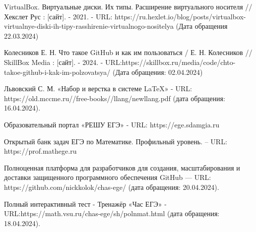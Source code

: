 \begin{thebibliography}{99}

VirtualBox. Виртуальные диски. Их типы. Расширение виртуального носителя // Хекслет Рус : [сайт]. - 2021. - URL: https://ru.hexlet.io/blog/posts/virtualbox-virtualnye-diski-ih-tipy-rasshirenie-virtualnogo-nositelya (Дата обращения 22.03.2024)

\end{thebibliography}

\begin{thebibliography}{99}

Колесников Е. Н. Что такое GitHub и как им пользоваться / Е. Н. Колесников // SkillBox Media : [сайт]. - 2024. - URL:https://skillbox.ru/media/code/chto-takoe-github-i-kak-im-polzovatsya/ (Дата обращения: 02.04.2024)

\end{thebibliography}

\begin{thebibliography}{99}

Львовский С. М. «Набор и верстка в системе LaTeX» - URL: https://old.mccme.ru//free-books//llang/newllang.pdf (дата обращения: 16.04.2024).

\end{thebibliography}

\begin{thebibliography}{99}

Образовательный портал «РЕШУ ЕГЭ» - URL: https://ege.sdamgia.ru 

\end{thebibliography}

\begin{thebibliography}{99}

Открытый банк задач ЕГЭ по Математике. Профильный уровень. – URL: https://prof.mathege.ru

\end{thebibliography}

\begin{thebibliography}{99}

Полноценная платформа для разработчиков для создания, масштабирования и доставки защищенного программного обеспечения GitHub — URL: https://github.com/nickkolok/chas-ege/ (дата обращения: 20.04.2024).  
\end{thebibliography}

\begin{thebibliography}{99}

Полный интерактивный тест - Тренажёр «Час ЕГЭ» - URL:https://math.vsu.ru/chas-ege/sh/polnmat.html (дата обращения: 18.04.2024).
\end{thebibliography}
